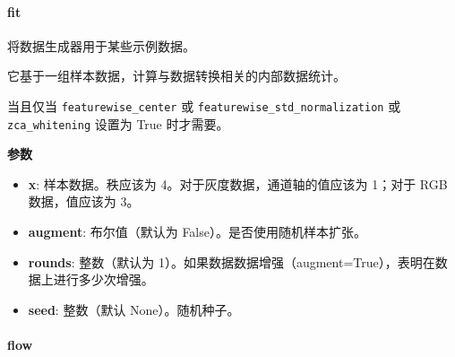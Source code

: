 \hypertarget{fit}{%
\paragraph{fit}\label{fit}}

\begin{Shaded}
\begin{Highlighting}[]
\OperatorTok{=}\OperatorTok{=}\OperatorTok{=}\NormalTok{)}
\end{Highlighting}
\end{Shaded}

将数据生成器用于某些示例数据。

它基于一组样本数据，计算与数据转换相关的内部数据统计。

当且仅当 \texttt{featurewise\_center} 或
\texttt{featurewise\_std\_normalization} 或 \texttt{zca\_whitening}
设置为 True 时才需要。

\textbf{参数}

\begin{itemize}
\tightlist
\item
  \textbf{x}: 样本数据。秩应该为 4。对于灰度数据，通道轴的值应该为
  1；对于 RGB 数据，值应该为 3。
\item
  \textbf{augment}: 布尔值（默认为 False）。是否使用随机样本扩张。
\item
  \textbf{rounds}: 整数（默认为
  1）。如果数据数据增强（augment=True），表明在数据上进行多少次增强。
\item
  \textbf{seed}: 整数（默认 None）。随机种子。
\end{itemize}


\hypertarget{flow}{%
\paragraph{flow}\label{flow}}

\begin{Shaded}
\begin{Highlighting}[]
\OperatorTok{=}
\OperatorTok{=}
\OperatorTok{=}
\OperatorTok{=}
\OperatorTok{=}
\OperatorTok{=}
\OperatorTok{=}
\OperatorTok{=}
\OperatorTok{=}\NormalTok{)}
\end{Highlighting}
\end{Shaded}

